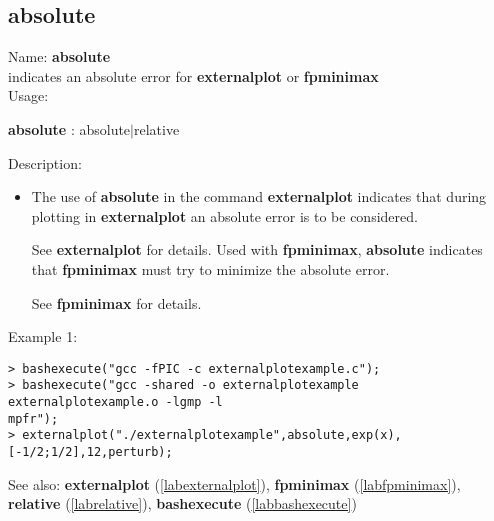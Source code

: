 \subsection{absolute}
\label{lababsolute}
\noindent Name: \textbf{absolute}\\
indicates an absolute error for \textbf{externalplot} or \textbf{fpminimax}\\
\noindent Usage: 
\begin{center}
\textbf{absolute} : \textsf{absolute$|$relative}
\\ 
\end{center}
\noindent Description: \begin{itemize}

\item The use of \textbf{absolute} in the command \textbf{externalplot} indicates that during
   plotting in \textbf{externalplot} an absolute error is to be considered.
    
   See \textbf{externalplot} for details.
   Used with \textbf{fpminimax}, \textbf{absolute} indicates that \textbf{fpminimax} must try to minimize
   the absolute error.
    
   See \textbf{fpminimax} for details.
\end{itemize}
\noindent Example 1: 
\begin{center}\begin{minipage}{15cm}\begin{Verbatim}[frame=single]
> bashexecute("gcc -fPIC -c externalplotexample.c");
> bashexecute("gcc -shared -o externalplotexample externalplotexample.o -lgmp -l
mpfr");
> externalplot("./externalplotexample",absolute,exp(x),[-1/2;1/2],12,perturb);
\end{Verbatim}
\end{minipage}\end{center}
See also: \textbf{externalplot} (\ref{labexternalplot}), \textbf{fpminimax} (\ref{labfpminimax}), \textbf{relative} (\ref{labrelative}), \textbf{bashexecute} (\ref{labbashexecute})
